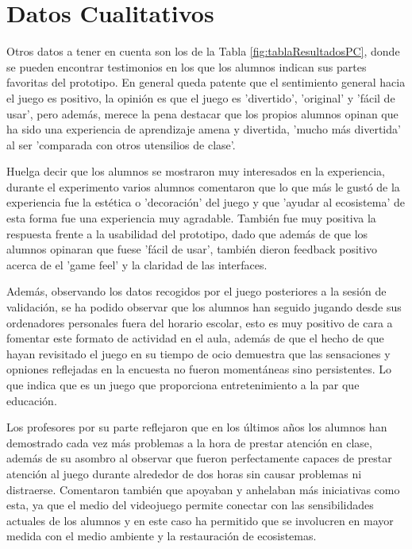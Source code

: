 \section{Datos Cualitativos}

Otros datos a tener en cuenta son los de la Tabla \ref{fig:tablaResultadosPC}, donde se pueden encontrar testimonios en los que los alumnos indican 
sus partes favoritas del prototipo. En general queda patente que el sentimiento general hacia el juego es positivo, la opinión es que el juego es
 'divertido', 'original' y 'fácil de usar', pero además, merece la pena destacar que los propios alumnos opinan que ha sido una experiencia de 
 aprendizaje amena y divertida, 'mucho más divertida' al ser 'comparada con otros utensilios de clase'.

 Huelga decir que los alumnos se mostraron muy interesados en la experiencia, durante el experimento varios alumnos comentaron que lo que más le gustó de
  la experiencia fue la estética o 'decoración' del juego y que 'ayudar al ecosistema' de esta forma fue una experiencia muy agradable. También fue muy positiva 
  la respuesta frente a la usabilidad del prototipo, dado que además de que los alumnos opinaran que fuese 'fácil de usar', también dieron feedback positivo acerca de
  el 'game feel' y la claridad de las interfaces.

 Además, observando los datos recogidos por el juego posteriores a la sesión de validación, se ha podido observar que los alumnos han seguido jugando desde sus ordenadores 
 personales fuera del horario escolar, esto es muy positivo de cara a fomentar este formato de actividad en el aula, además de que el hecho de que hayan revisitado el juego
 en su tiempo de ocio demuestra que las sensaciones y opniones reflejadas en la encuesta no fueron momentáneas sino persistentes. Lo que indica que es un juego que proporciona 
 entretenimiento a la par que educación.

 Los profesores por su parte reflejaron que en los últimos años los alumnos han demostrado cada vez más problemas a la hora de prestar atención en clase, además de su asombro
  al observar que fueron perfectamente capaces de prestar atención al juego durante alrededor de dos horas sin causar problemas ni distraerse. Comentaron también que apoyaban 
  y anhelaban más iniciativas como esta, ya que el medio del videojuego permite conectar con las sensibilidades actuales de los alumnos y en este caso ha permitido que
  se involucren en mayor medida con el medio ambiente y la restauración de ecosistemas.